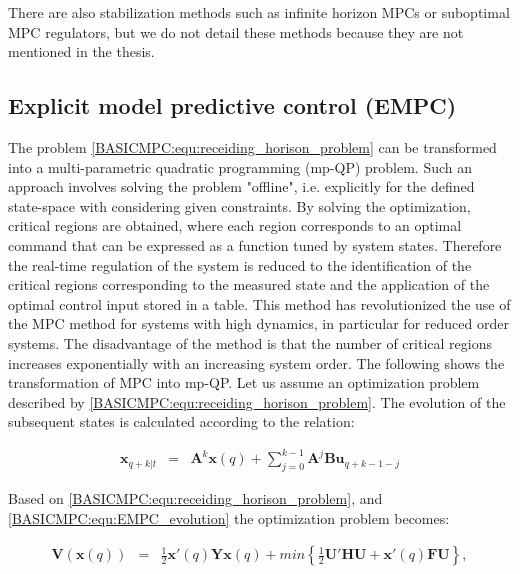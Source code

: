 There are also stabilization methods such as infinite horizon MPCs or suboptimal MPC regulators, but we do not detail these methods because they are not mentioned in the thesis.

\subsection{Explicit model predictive control (EMPC)}\label{BASICCSR:sec:EMPC}

The problem \ref{BASICMPC:equ:receiding_horison_problem} can be transformed into a multi-parametric quadratic programming (mp-QP) problem. Such an approach involves solving the problem "offline", i.e. explicitly for the defined state-space with considering given constraints. By solving the optimization, critical regions are obtained, where each region corresponds to an optimal command that can be expressed as a function tuned by system states. Therefore the real-time regulation of the system is reduced to the identification of the critical regions corresponding to the measured state and the application of the optimal control input stored in a table. This method has revolutionized the use of the MPC method for systems with high dynamics, in particular for reduced order systems. The disadvantage of the method is that the number of critical regions increases exponentially with an increasing system order. The following shows the transformation of MPC into mp-QP.
Let us assume an optimization problem described by \ref{BASICMPC:equ:receiding_horison_problem}. The evolution of the subsequent states is calculated according to the relation:

\begin{equation}
        \begin{array}{rcl}
				\textbf{x}_{q+k|t}&=&\textbf{A}^k\textbf{x}(q)+\sum^{k-1}_{j=0}\textbf{A}^j\textbf{Bu}_{q+k-1-j}
        \end{array}
        \label{BASICMPC:equ:EMPC_evolution}
    \end{equation}

Based on \ref{BASICMPC:equ:receiding_horison_problem}, and \ref{BASICMPC:equ:EMPC_evolution} the optimization problem becomes:

\begin{equation}
        \begin{array}{rcl}
				\textbf{V}(\textbf{x}(q))&=&\frac{1}{2}\textbf{x}'(q)\textbf{Yx}(q)+min\left\{\frac{1}{2}\textbf{U}'\textbf{HU}+\textbf{x}'(q)\textbf{FU}\right\},\\
        \end{array}
        \label{BASICMPC:equ:EMPC_transformed}
    \end{equation}
		
